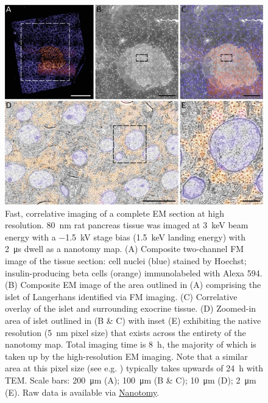 \begin{figure}[!tbh]
    \centering
    \includegraphics[width=\linewidth]{chapter-2/figures_JPEG_LQ/fig2-7_rat.jpg}
    \caption{Fast, correlative imaging of a complete EM section at high resolution. \SI{80}{\nano\meter} rat pancreas tissue was imaged at \SI{3}{\kilo\electronvolt} beam energy with a \SI{-1.5}{\kilo\volt} stage bias (\SI{1.5}{\kilo\electronvolt} landing energy) with \SI{2}{\micro\second} dwell as a nanotomy map. (A) Composite two-channel FM image of the tissue section: cell nuclei (blue) stained by Hoechst; insulin-producing beta cells (orange) immunolabeled with Alexa 594. (B) Composite EM image of the area outlined in (A) comprising the islet of Langerhans identified via FM imaging. (C) Correlative overlay of the islet and surrounding exocrine tissue. (D) Zoomed-in area of islet outlined in (B \& C) with inset (E) exhibiting the native resolution (\SI{5}{\nano\meter} pixel size) that exists across the entirety of the nanotomy map. Total imaging time is \SI{8}{\hour}, the majority of which is taken up by the high-resolution EM imaging. Note that a similar area at this pixel size (see e.g. \textcite{ravelli2013destruction}) typically takes upwards of \SI{24}{\hour} with TEM. Scale bars: \SI{200}{\micro\meter} (A); \SI{100}{\micro\meter} (B \& C); \SI{10}{\micro\meter} (D); \SI{2}{\micro\meter} (E). Raw data is available via \href{www.nanotomy.org}{Nanotomy}.}
    \label{fig:2.7_rat}
\end{figure}


